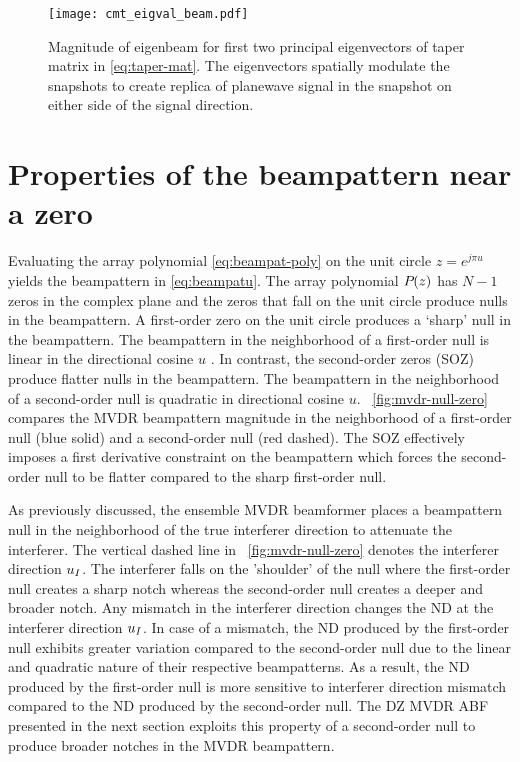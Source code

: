 \begin{figure}[!htb]
  \centering
  \texttt{[image: cmt\_eigval\_beam.pdf]}
  \caption{Magnitude of eigenbeam for first two principal eigenvectors of taper matrix in \eqn{}\eqref{eq:taper-mat}. The eigenvectors spatially modulate the snapshots to create replica of planewave signal in the snapshot on either side of the signal direction.}
  \label{fig:cmt-eigenbeam}
\end{figure}

\section{Properties of the beampattern near a  zero}
\label{sec:second-order-zeros}
Evaluating the array polynomial \eqref{eq:beampat-poly} on the unit
circle $z = e^{j\pi u}$ yields the beampattern in
\eqref{eq:beampatu}. The array polynomial ${P}_{}(z)$ has $N - 1$
zeros in the complex plane and the zeros that fall on the unit circle
produce nulls in the beampattern. A first-order zero on the unit
circle produces a `sharp' null in the beampattern. The beampattern in
the neighborhood of a first-order null is linear in the directional
cosine $u$ \cite[Sec.~3.2.3]{vtree2002oap}\cite{Steinberg1976}. In contrast, the
second-order zeros (SOZ) produce flatter nulls in the beampattern. The
beampattern in the neighborhood of a second-order null is quadratic in
directional cosine $u$. \figurename{}~\ref{fig:mvdr-null-zero}
compares the MVDR beampattern magnitude in the neighborhood of a first-order
null (blue solid) and a second-order null (red dashed). The SOZ effectively
imposes a first derivative constraint on the beampattern which forces
the second-order null to be flatter compared to the sharp first-order
null.

As previously discussed, the ensemble MVDR beamformer places a
beampattern null in the neighborhood of the true interferer direction
to attenuate the interferer. The vertical dashed line in
\figurename{}~\ref{fig:mvdr-null-zero} denotes the interferer
direction $u_I$. The interferer falls on the 'shoulder' of the
null where the first-order null creates a sharp notch whereas the
second-order null creates a deeper and broader notch. Any mismatch in
the interferer direction changes the ND at the interferer direction
$u_I$. In case of a mismatch, the ND produced by the first-order
null exhibits greater variation compared to the second-order null
due to the linear and quadratic nature of their respective
beampatterns. As a result, the ND produced by the first-order null is
more sensitive to interferer direction mismatch compared to the ND
produced by the second-order null. The DZ MVDR ABF presented in the
next section exploits this property of a second-order null to produce
broader notches in the MVDR beampattern.

